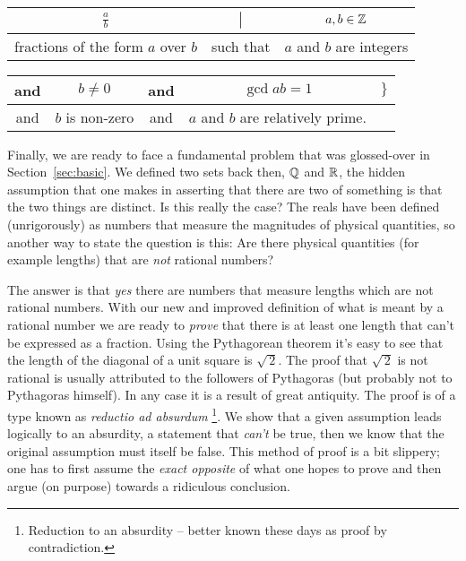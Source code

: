 \vspace{.2in}

\begin{tabular}{c|c|c}
\rule[-10pt]{0pt}{22pt} $\displaystyle \frac{a}{b}$ & $\suchthat$ & $a,b \in {\mathbb Z}$ \\ \hline
\rule[-6pt]{0pt}{22pt} fractions of the form $a$ over $b$ & such that
& $a$ and $b$ are integers \\
\end{tabular}

\vspace{.2in}

\begin{tabular}{c|c|c|c|c}
\rule[-10pt]{0pt}{22pt} and & $b \neq 0$ & and & $\gcd{a}{b}=1$ & $\}$
\\ \hline
\rule[-6pt]{0pt}{22pt}  and & $b$ is non-zero & and & $a$ and $b$ are relatively prime. &  \\
\end{tabular}

\vspace{.2in}

Finally, we are ready to face a fundamental problem that was
glossed-over in Section~\ref{sec:basic}.  We defined two sets
back then, ${\mathbb Q}$ and ${\mathbb R}$, the hidden assumption that one
makes in asserting that there are two of something is that the two
things are distinct.  Is this really the case?  The reals have been
defined (unrigorously) as numbers that measure the magnitudes of
physical quantities, so another way to state the question is this:
Are there physical quantities (for example lengths) that are {\em not}
rational numbers?  

The answer is that {\em yes} there are numbers that measure lengths
which are not rational numbers.  With our new and improved definition
of what is meant by a rational number we are ready to {\em prove} that 
there is at least one length that can't be expressed as a fraction.
Using the Pythagorean theorem it's easy to see that the length of the
diagonal of a unit square is $\sqrt{\,2}$.  The proof that $\sqrt{\,2}$ is
not rational is usually attributed to the followers of Pythagoras (but
probably not to Pythagoras himself).  In any case it is a result of
great antiquity.  The proof is of a type known as 
 \emph{reductio ad absurdum}
\footnote{Reduction to an absurdity -- better known these %
days as proof by contradiction. }.  We show that a given assumption
leads logically to an absurdity, a statement that {\em can't} be true,
then we know that the original assumption must itself be false.  This 
method of proof is a bit slippery; one has to first assume the 
\emph{exact opposite} of what one hopes to prove and then argue (on
purpose) towards a ridiculous conclusion.

